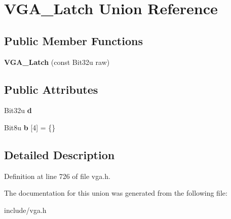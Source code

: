 \hypertarget{unionVGA__Latch}{\section{V\-G\-A\-\_\-\-Latch Union Reference}
\label{unionVGA__Latch}
}
\subsection*{Public Member Functions}
\begin{DoxyCompactItemize}
\item 
\hypertarget{unionVGA__Latch_a5a111beec19494774f0d14d62c14c597}{{\bfseries V\-G\-A\-\_\-\-Latch} (const Bit32u raw)}\label{unionVGA__Latch_a5a111beec19494774f0d14d62c14c597}

\end{DoxyCompactItemize}
\subsection*{Public Attributes}
\begin{DoxyCompactItemize}
\item 
\hypertarget{unionVGA__Latch_a68ae346aa35c3835ad2b7c988e9b53e6}{Bit32u {\bfseries d}}\label{unionVGA__Latch_a68ae346aa35c3835ad2b7c988e9b53e6}

\item 
\hypertarget{unionVGA__Latch_a2c3c0ab6db68a5db80e2f71639b089e1}{Bit8u {\bfseries b} \mbox{[}4\mbox{]} = \{\}}\label{unionVGA__Latch_a2c3c0ab6db68a5db80e2f71639b089e1}

\end{DoxyCompactItemize}


\subsection{Detailed Description}


Definition at line 726 of file vga.\-h.



The documentation for this union was generated from the following file\-:\begin{DoxyCompactItemize}
\item 
include/vga.\-h\end{DoxyCompactItemize}
